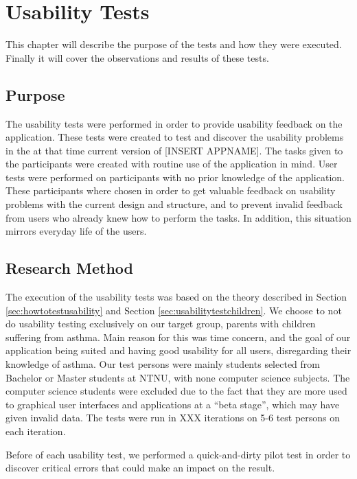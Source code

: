 \chapter{Usability Tests}
\label{chp:usabilitytests}

This chapter will describe the purpose of the tests and how they were executed. Finally it will cover the observations and results of these tests.


\section{Purpose}
\label{sec:usabilitypurpose}
The usability tests were performed in order to provide usability feedback on the application. These tests were created to test and discover the usability problems in the at that time current version of [INSERT APPNAME]. The tasks given to the participants were created with routine use of the application in mind. User tests were performed on participants with no prior knowledge of the application. These participants where chosen in order to get valuable feedback on usability problems with the current design and structure, and to prevent invalid feedback from users who already knew how to perform the tasks. In addition, this situation mirrors everyday life of the users.


\section{Research Method}
The execution of the usability tests was based on the theory described in Section \ref{sec:howtotestusability} and Section \ref{sec:usabilitytestchildren}. We choose to not do usability testing exclusively on our target group, parents with children suffering from asthma. Main reason for this was time concern, and the goal of our application being suited and having good usability for all users, disregarding their knowledge of asthma. Our test persons were mainly students selected from Bachelor or Master students at NTNU, with none computer science subjects. The computer science students were excluded due to the fact that they are more used to graphical user interfaces and applications at a ``beta stage'', which may have given invalid data. The tests were run in XXX iterations on 5-6 test persons on each iteration. 

Before of each usability test, we performed a quick-and-dirty pilot test in order to discover critical errors that could make an impact on the result.

